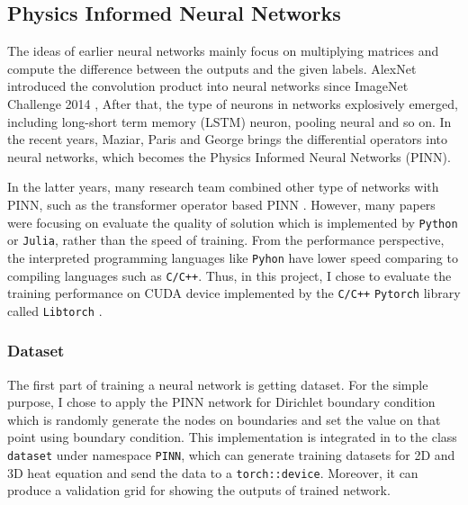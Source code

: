\subsection{Physics Informed Neural Networks}
The ideas of earlier neural networks mainly focus on multiplying matrices and compute the difference between the outputs and the given labels.
AlexNet introduced the convolution product into neural networks since ImageNet Challenge 2014 
                \cite{AlexNet}, 
After that, the type of neurons in networks explosively emerged, including long-short term memory (LSTM) neuron, pooling neural and so on.
In the recent years, Maziar, Paris and George 
                \cite{FIRST_PINN}
brings the differential operators into neural networks, which becomes the Physics Informed Neural Networks (PINN).

In the latter years, many research team combined other type of networks with PINN, such as the transformer operator based PINN 
                \cite{Transformer_PINN}.
However, many papers were focusing on evaluate the quality of solution which is implemented by \texttt{Python} or \texttt{Julia}, rather than the speed of training.
From the performance perspective, the interpreted programming languages like \texttt{Pyhon} have lower speed comparing to compiling languages such as \texttt{C/C++}.
Thus, in this project, I chose to evaluate the training performance on CUDA device implemented by the \texttt{C/C++} \texttt{Pytorch} library called \texttt{Libtorch} 
\cite{Libtorch}.


\subsubsection{Dataset}
The first part of training a neural network is getting dataset. 
For the simple purpose, I chose to apply the PINN network for Dirichlet boundary condition which is 
randomly generate the nodes on boundaries and set the value on that point using boundary condition.
This implementation is integrated in to the class \texttt{dataset} under namespace \texttt{PINN},
which can generate training datasets for 2D and 3D heat equation and send the data to a \texttt{torch::device}.
Moreover, it can produce a validation grid for showing the outputs of trained network.

